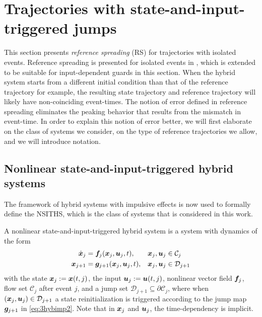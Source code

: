 \documentclass[../DC2019003Bouma.tex]{subfiles}
\begin{document}
\section{Trajectories with state-and-input-triggered jumps}
This section presents \textit{reference spreading} (RS) for trajectories with isolated events. Reference spreading is presented for isolated events in \cite{Saccon2014}, which is extended to be suitable for input-dependent guards in this section. When the hybrid system starts from a different initial condition than that of the reference trajectory for example, the resulting state trajectory and reference trajectory will likely have non-coinciding event-times. The notion of error defined in reference spreading eliminates the peaking behavior that results from the mismatch in event-time. In order to explain this notion of error better, we will first elaborate on the class of systems we consider, on the type of reference trajectories we allow, and we will introduce notation.
%

\subsection{Nonlinear state-and-input-triggered hybrid systems}
The framework of hybrid systems with impulsive effects is now used to formally define the NSITHS, which is the class of systems that is considered in this work.

\begin{sloppypar}
\begin{mydef}[NSITHS]\label{def:3nsiths}
A nonlinear state-and-input-triggered hybrid system is a system with dynamics of the form
\begin{align}
\dot{{\boldsymbol{x}}}_j &={\boldsymbol{f}}_j({\boldsymbol{x}}_j,{\boldsymbol{u}}_j,t), &{\boldsymbol{x}}_j,{\boldsymbol{u}}_j&\in \mathcal{C}_j\label{eq:3hybimp1}\\
{\boldsymbol{x}}_{j+1} &= {\boldsymbol{g}}_{j+1}({\boldsymbol{x}}_j,{\boldsymbol{u}}_j,t), &{\boldsymbol{x}}_j,{\boldsymbol{u}}_j&\in \mathcal{D}_{j+1} \label{eq:3hybimp2}
\end{align}
with the state ${\boldsymbol{x}}_j := {\boldsymbol{x}}(t,j)$, the input ${\boldsymbol{u}}_j := {\boldsymbol{u}}(t,j)$, nonlinear vector field ${\boldsymbol{f}}_j$, flow set $\mathcal{C}_j$ after event $j$, and a jump set $\mathcal{D}_{j+1}\subseteq\partial \mathcal{C}_j$, where when $({\boldsymbol{x}}_j,{\boldsymbol{u}}_j)\in \mathcal{D}_{j+1}$ a state reinitialization is triggered according to the jump map $ {\boldsymbol{g}}_{j+1}$ in \eqref{eq:3hybimp2}. Note that in ${\boldsymbol{x}}_j$ and ${\boldsymbol{u}}_j$, the time-dependency is implicit.
\end{mydef} 
\end{sloppypar}
\end{document}
